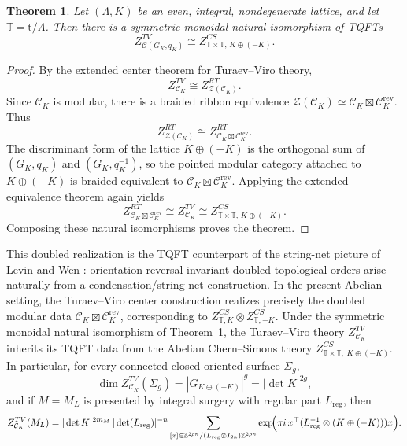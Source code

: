 \documentclass[12pt]{amsart}
\numberwithin{equation}{section}
\newtheorem{theorem}{Theorem}[section]
\theoremstyle{definition}
\begin{document}
\begin{theorem}
\label{thm:double-case}
Let $(\Lambda,K)$ be an even, integral, nondegenerate lattice, and let $\mathbb T= \mathrm t/\Lambda$. Then there is a symmetric monoidal natural isomorphism of TQFTs
$$
Z^{TV}_{\mathcal C(G_K,q_K)}
\cong
Z^{CS}_{\mathbb T\times \mathbb T,\,K\oplus(-K)}.
$$
\end{theorem}

\begin{proof}
By the extended center theorem for Turaev--Viro theory,
$$
Z^{TV}_{\mathcal C_K}\cong Z^{RT}_{\mathcal Z(\mathcal C_K)}.
$$
Since $\mathcal C_K$ is modular, there is a braided ribbon equivalence $\mathcal Z(\mathcal C_K)\simeq \mathcal C_K\boxtimes \mathcal C^{\mathrm{rev}}_K.$ Thus
$$
Z^{RT}_{\mathcal Z(\mathcal C_K)}\cong
Z^{RT}_{\mathcal C_K\boxtimes \mathcal C^{\mathrm{rev}}_K}.
$$
The discriminant form of the lattice $K\oplus(-K)$ is the orthogonal sum of $(G_K,q_K)$ and $(G_K,q_K^{-1})$, so the pointed modular category attached to $K\oplus(-K)$ is braided equivalent to $\mathcal C_K\boxtimes \mathcal C^{\mathrm{rev}}_K$.  Applying the extended equivalence theorem again yields
$$
Z^{RT}_{\mathcal C_K\boxtimes \mathcal C^{\mathrm{rev}}_K}
\cong Z^{TV}_{\mathcal C_K}\cong
Z^{CS}_{\mathbb T\times \mathbb T,\,K\oplus(-K)}.
$$
Composing these natural isomorphisms proves the theorem.
\end{proof}
This doubled realization is the TQFT counterpart of the string-net picture of Levin and Wen \cite{LevinWen05}: orientation-reversal invariant doubled topological orders arise naturally from a condensation/string-net construction. In the present Abelian setting, the Turaev--Viro center construction realizes precisely the doubled modular data $\mathcal C_K \boxtimes \mathcal C_K^{\mathrm{rev}}$, corresponding to $Z^{CS}_{\mathbb T,K}\otimes Z^{CS}_{\mathbb T,-K}$. Under the symmetric monoidal natural isomorphism of Theorem~\ref{thm:double-case}, the Turaev--Viro theory $Z^{TV}_{\mathcal C_K}$ inherits its TQFT data from the Abelian Chern--Simons theory $Z^{CS}_{\mathbb T\times \mathbb T,\;K\oplus(-K)}.$ In particular, for every connected closed oriented surface $\Sigma_g$,
$$
\dim Z^{TV}_{\mathcal C_K}(\Sigma_g)
=
|G_{K\oplus(-K)}|^g
=
|\det K|^{2g},
$$
and if $M=M_L$ is presented by integral surgery with regular part $L_{\mathrm{reg}}$, then
$$
Z^{TV}_{\mathcal C_K}(M_L)
=
|\det K|^{2m_M}\,
|\det(L_{\mathrm{reg}})|^{-n}
\sum_{[x]\in \mathbb Z^{2\rho n}/(L_{\mathrm{reg}}\otimes I_{2n})\mathbb Z^{2\rho n}}
\exp\!\Bigl(\pi i\,x^\top(L_{\mathrm{reg}}^{-1}\otimes (K\oplus(-K)))x\Bigr).
$$
\end{document}
